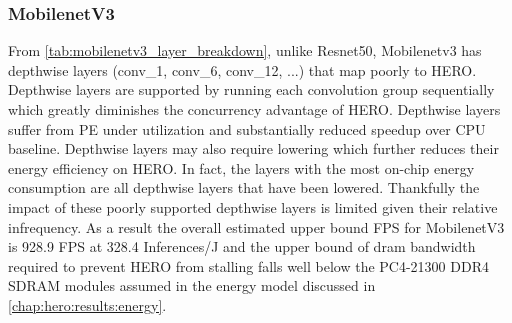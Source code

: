 \subsubsection{MobilenetV3}

From \autoref{tab:mobilenetv3_layer_breakdown}, unlike Resnet50, Mobilenetv3 has
depthwise layers (conv\_1, conv\_6, conv\_12, ...) that map poorly to HERO.
Depthwise layers are supported by running each convolution group sequentially
which greatly diminishes the concurrency advantage of HERO. Depthwise layers
suffer from PE under utilization and substantially reduced speedup over CPU
baseline. Depthwise layers may also require lowering which further reduces their
energy efficiency on HERO. In fact, the layers with the most on-chip energy
consumption are all depthwise layers that have been lowered. Thankfully the
impact of these poorly supported depthwise layers is limited given their
relative infrequency. As a result the overall estimated upper bound FPS for
MobilenetV3 is 928.9 FPS at 328.4 Inferences/J and the upper bound of dram bandwidth
required to prevent HERO from stalling falls well below the PC4-21300 DDR4 SDRAM
modules assumed in the energy model discussed in
\autoref{chap:hero:results:energy}. 


